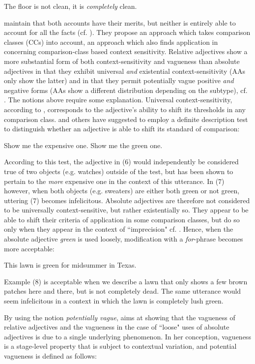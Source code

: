 \documentclass[output=paper]{langsci/langscibook}
\begin{document}
\ea
	The floor is not clean, it is \textit{completely} clean.
\z

\citet*{Toledo2011} maintain that both accounts have their merits, but neither is entirely able to account for all the facts (cf. \citealt[140]{Toledo2011}). They propose an approach which takes comparison classes (CCs) into account, an approach which also finds application in \citet{Burnett2017} concerning comparison-class based context sensitivity.
Relative adjectives show a more substantial form of both context-sensitivity and vagueness than absolute adjectives in that they exhibit universal \textit{and} existential context-sensitivity (AAs only show the latter) and in that they permit potentially vague positive \textit{and} negative forms (AAs show a different distribution depending on the subtype), cf. \citet{Burnett2017}. The notions above require some explanation. Universal context-sensitivity, according to \textcite[41]{Burnett2017}, corresponds to the adjective's ability to shift its thresholds in any comparison class. \textcite[28]{Kennedy2007} and others have suggested to employ a definite description test to distinguish whether an adjective is able to shift its standard of comparison:

\ea
	Show me the expensive one.
\z
\ea
	Show me the green one.
\z

According to this test, the adjective in (6) would independently be considered true of two objects (e.g. watches) outside of the test, but has been shown to pertain to the \textit{more} expensive one in the context of this utterance. In (7) however, when both objects (e.g. sweaters) are either both green or not green, uttering (7) becomes infelicitous. Absolute adjectives are therefore not considered to be universally context-sensitive, but rather existentially so. They appear to be able to shift their criteria of application in some comparison classes, but do so only when they appear in the context of ``imprecision" cf. \textcite[42]{Burnett2017}. Hence, when the absolute adjective \textit{green} is used loosely, modification with a \textit{for}-phrase becomes more acceptable:

\ea
	This lawn is green for midsummer in Texas.
\z

Example (8) is acceptable when we describe a lawn that only shows a few brown patches here and there, but is not completely dead. The same utterance would seem infelicitous in a context in which the lawn is completely lush green.

By using the notion \textit{potentially vague}, \textcite[49]{Burnett2017} aims at showing that the vagueness of relative adjectives and the vagueness in the case of ``loose" uses of absolute adjectives is due to a single underlying phenomenon. In her conception, vagueness is a stage-level property that is subject to contextual variation, and potential vagueness is defined as follows:
\end{document}
